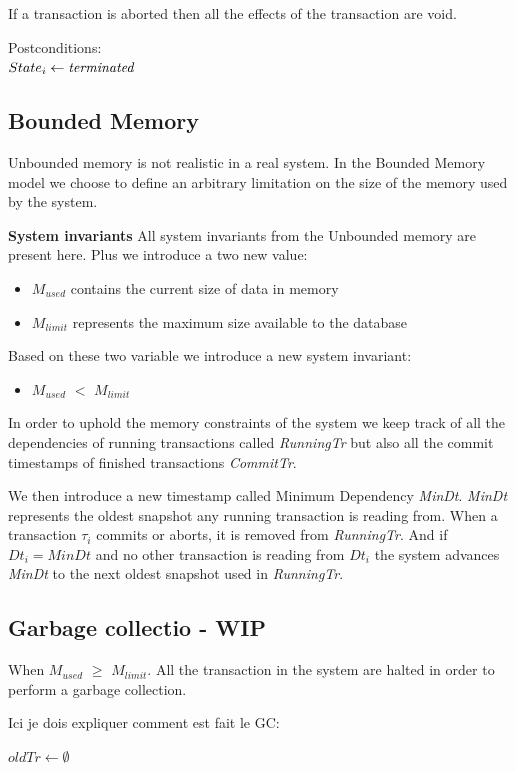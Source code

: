 \documentclass[systeme]{compas2022}
\begin{document}
If a transaction is aborted then all the effects of the transaction are void.

Postconditions:\\
$State_i \leftarrow \emph{terminated}$ \\

\subsection{Bounded Memory}

Unbounded memory is not realistic in a real system.
In the Bounded Memory model we choose to define an arbitrary limitation on the size of the memory used by the system.

\textbf{System invariants}
All system invariants from the Unbounded memory are present here.
Plus we introduce a two new value:
\begin{itemize}
  \item \emph{$M_{used}$} contains the current size of data in memory
  \item \emph{$M_{limit}$} represents the maximum size available to the database
\end{itemize}
Based on these two variable we introduce a new system invariant:
\begin{itemize}
  \item \emph{$M_{used}$} $<$ \emph{$M_{limit}$}
\end{itemize}
In order to uphold the memory constraints of the system we keep track of all the dependencies of running transactions called \emph{RunningTr} but also all the commit timestamps of finished transactions \emph{CommitTr}.

We then introduce a new timestamp called Minimum Dependency \emph{MinDt}.
\emph{MinDt} represents the oldest snapshot any running transaction is reading from.
When a transaction $\tau_i$ commits or aborts, it is removed from \emph{RunningTr}. 
And if $Dt_i = MinDt$ and no other transaction is reading from $Dt_i$ the system advances \emph{MinDt} to the next oldest snapshot used in \emph{RunningTr}.



\subsection{Garbage collectio - WIP}
When \emph{$M_{used}$} $\geq$ \emph{$M_{limit}$}. 
All the transaction in the system are halted in order to perform a garbage collection.

Ici je dois expliquer comment est fait le GC:\\
\begin{algorithm}
  \(oldTr \longleftarrow \emptyset\)\;
\end{algorithm}
\end{document}
